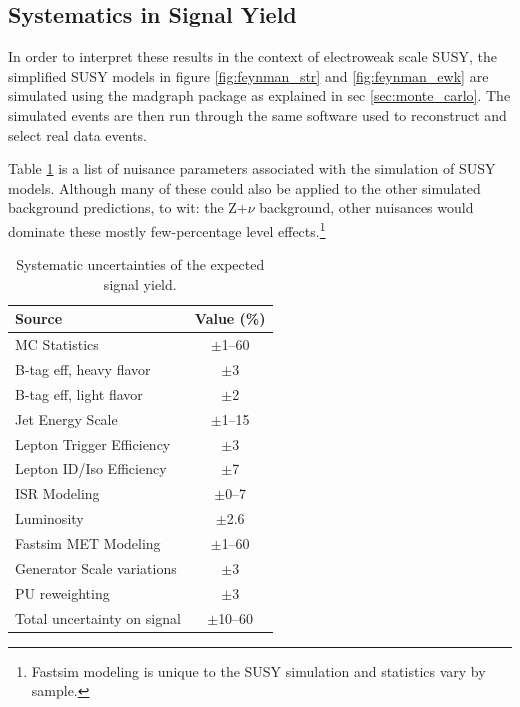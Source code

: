   \subsection{Systematics in Signal Yield} \label{sec:systematics_in_signal_yield}
    In order to interpret these results in the context of electroweak scale SUSY, the simplified SUSY models in figure \ref{fig:feynman_str} and \ref{fig:feynman_ewk} are simulated using the madgraph package as explained in sec \ref{sec:monte_carlo}. The simulated events are then run through the same software used to reconstruct and select real data events. 

    Table \ref{tab:syst} is a list of nuisance parameters associated with the simulation of SUSY models. Although many of these could also be applied to the other simulated background predictions, to wit: the Z+$\nu$ background, other nuisances would dominate these mostly few-percentage level effects.\footnote{Fastsim \MET modeling is unique to the SUSY simulation and statistics vary by sample.} 

    \begin{table}[htb]
      \begin{center}
        \caption{\label{tab:syst} Systematic uncertainties of the expected signal yield. }
        \begin{tabular}{l|c}
          \hline
          \hline
          Source                     & Value (\%) \\
          \hline
          MC Statistics              & $\pm$1--60 \\
          B-tag eff, heavy flavor    & $\pm$3     \\
          B-tag eff, light flavor    & $\pm$2     \\
          Jet Energy Scale           & $\pm$1--15 \\
          Lepton Trigger Efficiency  & $\pm$3     \\
          Lepton ID/Iso Efficiency   & $\pm$7     \\
          ISR Modeling               & $\pm$0--7  \\
          Luminosity \cite{Lumi_unc} & $\pm$2.6   \\
          Fastsim MET Modeling       & $\pm$1--60 \\
          Generator Scale variations & $\pm$3     \\
          PU reweighting             & $\pm$3     \\
          \hline
          Total uncertainty on signal& $\pm$10--60 \\
          \hline
          \hline
        \end{tabular}
      \end{center}
    \end{table}


